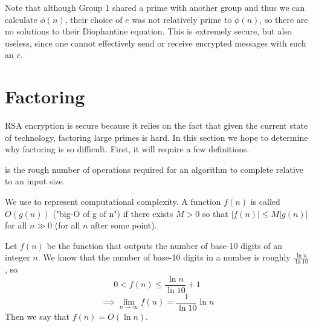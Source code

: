 \begin{example}
Note that although Group 1 shared a prime with another group and thus we can calculate $\phi(n)$, their choice of $e$ was not relatively prime to $\phi(n)$, so there are no solutions to their Diophantine equation. This is extremely secure, but also useless, since one cannot effectively send or receive encrypted messages with such an $e$.
\end{example}

\section{Factoring}
RSA encryption is secure because it relies on the fact that given the current state of technology, factoring large primes is hard. In this section we hope to determine why factoring is so difficult. First, it will require a few definitions.

\begin{definition}  is the rough number of operations required for an algorithm to complete relative to an input size.
\end{definition}

\begin{definition} We use  to represent computational complexity. A function $f(n)$ is called $O(g(n))$ ("big-O of g of n") if there exists $M>0$ so that $|f(n)|\leq M|g(n)|$ for all $n\gg0$ (for all $n$ after some point).
\end{definition}

\begin{example} Let $f(n)$ be the function that outputs the number of base-10 digits of an integer $n$. We know that the number of base-10 digits in a number is roughly $\frac{\ln n}{\ln 10}$, so
$$0<f(n)\leq\frac{\ln n}{\ln 10}+1$$
$$\implies\lim_{n\to\infty} f(n)=\frac{1}{\ln 10}\ln n$$
Then we say that $f(n)=O(\ln n)$.
\end{example}

